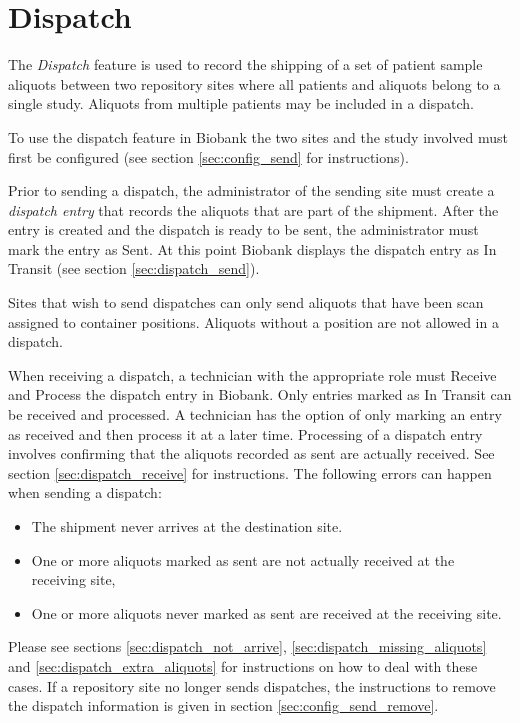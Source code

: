 \chapter{Dispatch}
The \emph{Dispatch} feature is used to record the shipping of a set of patient
sample aliquots between two repository sites where all patients and aliquots
belong to a single study.  Aliquots from multiple patients may be included in a
dispatch.

To use the dispatch feature in Biobank the two sites and the study involved
must first be configured (see section \ref{sec:config_send} for instructions).

Prior to sending a dispatch, the administrator of the sending site must create
a \emph{dispatch entry} that records the aliquots that are part of the
shipment. After the entry is created and the dispatch is ready to be sent, the
administrator must mark the entry as Sent. At this point Biobank displays the
dispatch entry as In Transit (see section \ref{sec:dispatch_send}).

Sites that wish to send dispatches can only send aliquots that have been scan
assigned to container positions. Aliquots without a position are not allowed in
a dispatch.

When receiving a dispatch, a technician with the appropriate role must Receive
and Process the dispatch entry in Biobank. Only entries marked as In Transit
can be received and processed. A technician has the option of only marking an
entry as received and then process it at a later time. Processing of a dispatch
entry involves confirming that the aliquots recorded as sent are actually
received. See section \ref{sec:dispatch_receive} for instructions.  The
following errors can happen when sending a dispatch:
\begin{itemize}
  \item The shipment never arrives at the destination site.
  \item One or more aliquots marked as sent are not actually received at the
    receiving site,
  \item One or more aliquots never marked as sent are received at the receiving
    site.
\end{itemize}
Please see sections \ref{sec:dispatch_not_arrive},
\ref{sec:dispatch_missing_aliquots} and \ref{sec:dispatch_extra_aliquots} for
instructions on how to deal with these cases.  If a repository site no longer
sends dispatches, the instructions to remove the dispatch information is given
in section \ref{sec:config_send_remove}.
